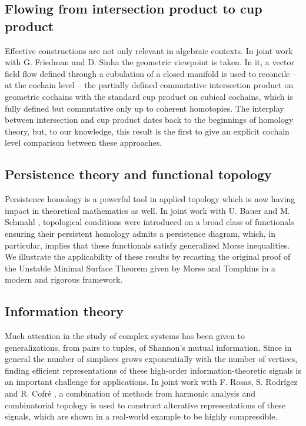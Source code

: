 \subsection{Flowing from intersection product to cup product} \label{ss:flowing}

Effective constructions are not only relevant in algebraic contexts.
In joint work with G. Friedman and D. Sinha \cite{medina2021flowing} the geometric viewpoint is taken.
In it, a vector field flow defined through a cubulation of a closed manifold is used to reconcile -- at the cochain level -- the partially defined commutative intersection product on geometric cochains with the standard cup product on cubical cochains, which is fully defined but commutative only up to coherent homotopies.
The interplay between intersection and cup product dates back to the beginnings of homology theory, but, to our knowledge, this result is the first to give an explicit cochain level comparison between these approaches.

\subsection{Persistence theory and functional topology}

Persistence homology is a powerful tool in applied topology which is now having impact in theoretical mathematics as well.
In joint work with U. Bauer and M. Schmahl \cite{medina2022fuct_top}, topological conditions were introduced on a broad class of functionals ensuring their persistent homology admits a persistence diagram, which, in particular, implies that these functionals satisfy generalized Morse inequalities.
We illustrate the applicability of these results by recasting the original proof of the Unstable Minimal Surface Theorem given by Morse and Tompkins in a modern and rigorous framework.

\subsection{Information theory}

Much attention in the study of complex systems has been given to generalizations, from pairs to tuples, of Shannon's mutual information.
Since in general the number of simplices grows exponentially with the number of vertices, finding efficient representations of these high-order information-theoretic signals is an important challenge for applications.
In joint work with F. Rosas, S. Rodr\'igez and R. Cofr\'e  \cite{medina2021hyperharmonic}, a combination of methods from harmonic analysis and combinatorial topology is used to construct alterative representations of these signals, which are shown in a real-world example to be highly compressible.